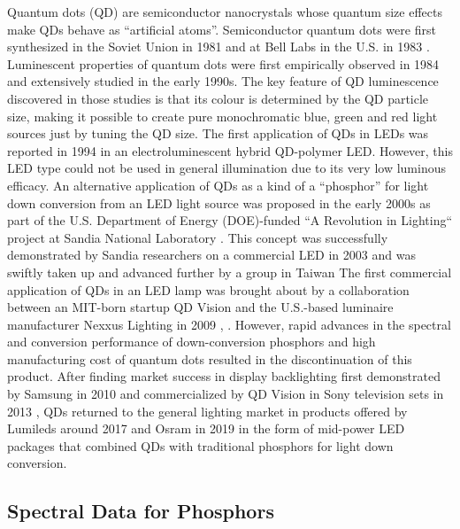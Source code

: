 \documentclass[parskip=full]{article}
\begin{document}
Quantum dots (QD) are semiconductor nanocrystals whose quantum size effects make QDs behave as “artificial atoms”. Semiconductor quantum dots were first synthesized in the Soviet Union in 1981 \cite{ekimov1981quantum} and at Bell Labs in the U.S. in 1983 \cite{Rossetti1983}. Luminescent properties of quantum dots were first empirically observed in 1984 \cite{fojtik1984photo} and extensively studied in the early 1990s. The key feature of QD luminescence discovered in those studies is that its colour is determined by the QD particle size, making it possible to create pure monochromatic blue, green and red light sources just by tuning the QD size. The first application of QDs in LEDs was reported in 1994 in an electroluminescent hybrid QD-polymer LED. However, this LED type could not be used in general illumination due to its very low luminous efficacy. An alternative application of QDs as a kind of a “phosphor” for light down conversion from an LED light source was proposed in the early 2000s as part of the U.S. Department of Energy (DOE)-funded “A Revolution in Lighting“ project at Sandia National Laboratory \cite{simmonsfinal}. This concept was successfully demonstrated by Sandia researchers on a commercial LED in 2003 \cite{shea_rohwer_development_2004}\cite{noauthor_sandia_nodate} and was swiftly taken up and advanced further by a group in Taiwan \cite{Chen_2005}\cite{Hsueh_Shih_Chen_2006} The first commercial application of QDs in an LED lamp was brought about by a collaboration between an MIT-born startup QD Vision and the U.S.-based luminaire manufacturer Nexxus Lighting in 2009 \cite{ledprof_nexxusqd}, \cite{bourzac2013quantum}. However, rapid advances in the spectral and conversion performance of down-conversion phosphors and high manufacturing cost of quantum dots resulted in the discontinuation of this product. After finding market success in display backlighting first demonstrated by Samsung in 2010 \cite{Jang2010} and commercialized by QD Vision in Sony television sets in 2013 \cite{bourzac2013quantum}, QDs returned to the general lighting market in products offered by Lumileds \cite{noauthor_global_2017}\cite{noauthor_quantum_2020} around 2017 and Osram in 2019 \cite{osramqdots} in the form of mid-power LED packages that combined QDs with traditional phosphors for light down conversion.

\subsection{Spectral Data for Phosphors}
\end{document}
